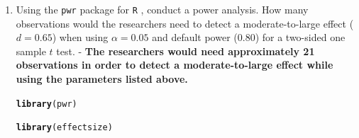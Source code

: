 \documentclass{article}\usepackage[]{graphicx}\usepackage[]{xcolor}
\makeatletter
\newcommand{\hldef}[1]{\textcolor[rgb]{0.345,0.345,0.345}{#1}}%
\newcommand{\hlkwd}[1]{\textcolor[rgb]{0.737,0.353,0.396}{\textbf{#1}}}%
\newenvironment{kframe}{%
 \def\at@end@of@kframe{}%
 \ifinner\ifhmode%
  \def\at@end@of@kframe{\end{minipage}}%
  \begin{minipage}{\columnwidth}%
 \fi\fi%
 \def\FrameCommand##1{\hskip\@totalleftmargin \hskip-\fboxsep
 \colorbox{shadecolor}{##1}\hskip-\fboxsep
     \hskip-\linewidth \hskip-\@totalleftmargin \hskip\columnwidth}%
 \MakeFramed {\advance\hsize-\width
   \@totalleftmargin\z@ \linewidth\hsize
   \@setminipage}}%
 {\par\unskip\endMakeFramed%
 \at@end@of@kframe}
\newenvironment{knitrout}{}{} %
\makeatother
\begin{document}
\begin{enumerate}

\item Using the \texttt{pwr} package for \texttt{R} \citep{pwr},
conduct a power analysis. How many observations would the researchers 
need to detect a moderate-to-large effect ($d=0.65$) when using 
$\alpha=0.05$ and default power (0.80) for a two-sided one sample 
$t$ test. - \textbf{The researchers would need approximately 21 observations in order to detect a moderate-to-large effect while using the parameters listed above.}

\begin{knitrout}\scriptsize
{}\color{fgcolor}\begin{kframe}
\begin{alltt}
\hlkwd{library}\hldef{(pwr)}
\end{alltt}


{\ttfamily\noindent\color{warningcolor}{\#\# Warning: package 'pwr' was built under R version 4.4.3}}\begin{alltt}
\hlkwd{library}\hldef{(effectsize)}
\end{alltt}



\end{kframe}
\end{knitrout}
\end{enumerate}
\end{document}
